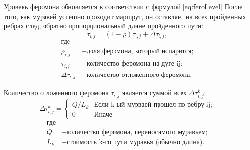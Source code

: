\documentclass[12pt]{report}
\begin{document}
\begin{enumerate}
    	Уровень феромона обновляется в соответствии с формулой \ref{eq:feroLevel}
    	После того, как муравей успешно проходит маршрут, он оставляет на всех пройденных ребрах след, обратно пропорциональный длине пройденного пути:
    	\begin{equation}
    		\label{eq:feroLevel}
    		\tau _{i,j}=(1-\rho )\tau _{i,j}+\Delta \tau _{i,j},
    	\end{equation}
    	\begin{align*}
    		\text{где} \\
    		\rho _{i,j} &- \text{доля феромона, который испарится;} \\
    		\tau _{i,j} &- \text{количество феромона на дуге ij;} \\
    		\Delta \tau _{i,j} &- \text{количество отложенного феромона.}
    	\end{align*}
    	
    	Количество отложенного феромона $\tau _{i,j}$ является суммой всех $\Delta \tau _{i,j}^k$:\\
    	
    	\begin{equation}
    		\label{eq:add}
    		{\displaystyle \Delta \tau _{i,j}^k={\begin{cases}Q/L_{k}& {\mbox{Если k-ый мурваей прошел по ребру ij;}}\\0&{\mbox{Иначе}}\end{cases}}}
    	\end{equation}
    	\begin{align*}
    		\text{где} \\
    		Q &- \text{количество феромона, переносимого муравьем;} \\
    		L_{k} &- \text{стоимость k-го пути муравья (обычно длина).}
    	\end{align*} 
    	
    \end{enumerate}
    
\end{document}
